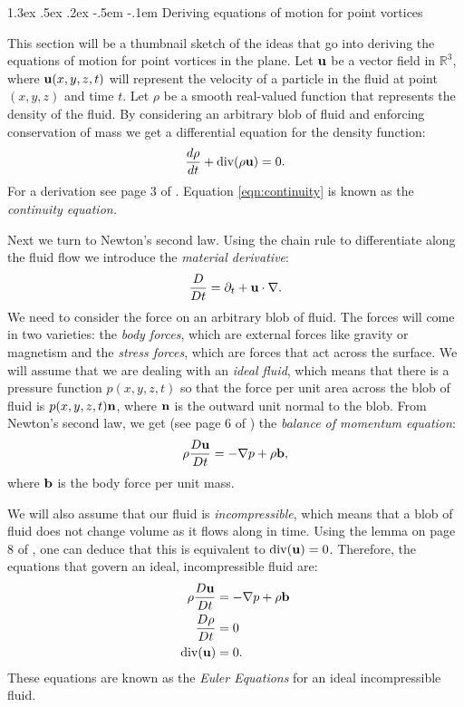 \documentclass[10pt,oneside]{amsart}
\makeatletter
\def\section{\@startsection{section}{1}{0in}%
                                   {1.3ex \@plus .5ex \@minus .2ex}%
                                   {-.5em \@plus -.1em}%
                                   {\reset@font\normalsize\bfseries}}
\theoremstyle{definition}
\theoremstyle{remark}
\numberwithin{equation}{section}
\makeatother
\begin{document}
\section{Deriving equations of motion for point vortices}

This section will be a thumbnail sketch of the ideas that go into deriving the equations of motion for point vortices in the plane. Let $\bf u$ be a vector field in $\mathbb{R}^3$, where ${\bf u }(x,y,z, t)$ will represent the velocity of a particle in the fluid at point $(x,y,z)$ and time $t$. Let $\rho$ be a smooth real-valued function that represents the density of the fluid. By considering an arbitrary blob of fluid and enforcing conservation of mass we get a differential equation for the density function:
\begin{align}
\label{eqn:continuity}
\frac{d \rho}{d t} +\mathrm{div}(\rho {\bf u}) = 0.
\end{align}
For a derivation see page 3 of \cite{book:chorin}. Equation \eqref{eqn:continuity} is known as the {\it continuity equation.}

Next we turn to Newton's second law. Using the chain rule to differentiate along the fluid flow we introduce the {\it material derivative}:
\begin{align*}
\frac{D}{Dt} = \partial_t + {\bf u} \cdot \nabla. 
\end{align*}
We need to consider the force on an arbitrary blob of fluid. The forces will come in two varieties: the {\it body forces}, which are external forces like gravity or magnetism and the {\it stress forces}, which are forces that act across the surface. We will assume that we are dealing with an {\it ideal fluid}, which means that there is a pressure function $p(x,y,z,t)$ so that the force per unit area across the blob of fluid is $p(x,y,z,t) {\bf n}$, where ${\bf n}$ is the outward unit normal to the blob. From Newton's second law, we get (see page 6 of \cite{book:chorin}) the {\it balance of momentum equation}:  
\begin{align}
\rho \frac{D {\bf u}}{Dt} = - \nabla p + \rho {\bf b},
\end{align}
where ${\bf b}$ is the body force per unit mass. 

We will also assume that our fluid is {\it incompressible}, which means that a blob of fluid does not change volume as it flows along in time. Using the lemma on page 8 of \cite{book:chorin}, one can deduce that this is equivalent to $\mathrm{div}({\bf u}) = 0$. Therefore, the equations that govern an ideal, incompressible fluid are:
\begin{align*}
\rho \frac{D {\bf u}}{Dt} &= - \nabla p + \rho {\bf b} \\
\frac{D \rho}{Dt} &= 0 \\
\mathrm{div}(\bf{u}) &= 0. 
\end{align*}
These equations are known as the {\it Euler Equations} for an ideal incompressible fluid.
\end{document}
